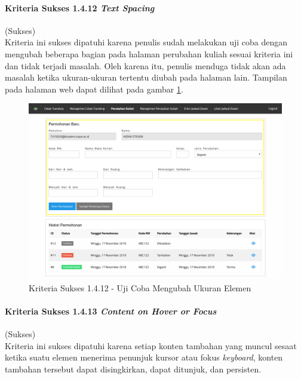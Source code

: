 \documentclass[a4paper,twoside]{article}
\begin{document}
\begin{enumerate}
		\paragraph{Kriteria Sukses 1.4.12 \textit{Text Spacing}}
		\label{par:kepatuhan_bluetape_kriteria_sukses_1.4.12}
		(Sukses)\\

		Kriteria ini sukses dipatuhi karena penulis sudah melakukan uji coba dengan mengubah beberapa bagian pada halaman perubahan kuliah sesuai kriteria ini dan tidak terjadi masalah. Oleh karena itu, penulis menduga tidak akan ada masalah ketika ukuran-ukuran tertentu diubah pada halaman lain. Tampilan pada halaman web dapat dilihat pada gambar \ref{fig:1.4.12_text_spacing}.

		\begin{figure}[H]
			\centering  
			\includegraphics[scale=0.3, frame]{kriteria-sukses-1-4-12-text-spacing}  
			\caption[Kriteria Sukses 1.4.12 - Uji Coba Mengubah Ukuran Elemen]{Kriteria Sukses 1.4.12 - Uji Coba Mengubah Ukuran Elemen}
			\label{fig:1.4.12_text_spacing}  
		\end{figure} 

		\paragraph{Kriteria Sukses 1.4.13 \textit{Content on Hover or Focus}}
		\label{par:kepatuhan_bluetape_kriteria_sukses_1.4.13}
		(Sukses)\\

		Kriteria ini sukses dipatuhi karena setiap konten tambahan yang muncul sesaat ketika suatu elemen menerima penunjuk kursor atau fokus \textit{keyboard}, konten tambahan tersebut dapat disingkirkan, dapat ditunjuk, dan persisten.


\end{enumerate}
\end{document}
